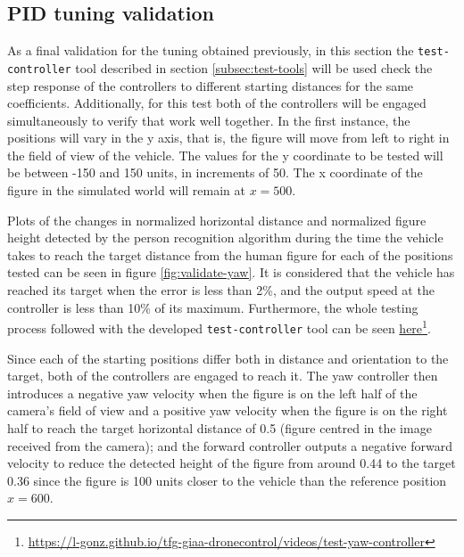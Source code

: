 \subsection{PID tuning validation}
\label{subsec:pid-test-controller}

As a final validation for the tuning obtained previously, in this section the \texttt{test-controller} tool described in section \ref{subsec:test-tools} will be used check the step response of the controllers to different starting distances for the same coefficients.
Additionally, for this test both of the controllers will be engaged simultaneously to verify that work well together.
In the first instance, the positions will vary in the y axis, that is, the figure will move from left to right in the field of view of the vehicle.
The values for the y coordinate to be tested will be between -150 and 150 units, in increments of 50.
The x coordinate of the figure in the simulated world will remain at $x=500$.

Plots of the changes in normalized horizontal distance and normalized figure height detected by the person recognition algorithm during the time the vehicle takes to reach the target distance from the human figure for each of the positions tested can be seen in figure \ref{fig:validate-yaw}.
It is considered that the vehicle has reached its target when the error is less than 2\%, and the output speed at the controller is less than 10\% of its maximum.
Furthermore, the whole testing process followed with the developed \texttt{test-controller} tool can be seen \href{https://l-gonz.github.io/tfg-giaa-dronecontrol/videos/test-yaw-controller}{here}\footnote{\url{https://l-gonz.github.io/tfg-giaa-dronecontrol/videos/test-yaw-controller}}.

Since each of the starting positions differ both in distance and orientation to the target, both of the controllers are engaged to reach it.
The yaw controller then introduces a negative yaw velocity when the figure is on the left half of the camera's field of view and a positive yaw velocity when the figure is on the right half to reach the target horizontal distance of 0.5 (figure centred in the image received from the camera);
and the forward controller outputs a negative forward velocity to reduce the detected height of the figure from around 0.44 to the target 0.36 since the figure is 100 units closer to the vehicle than the reference position $x=600$.

